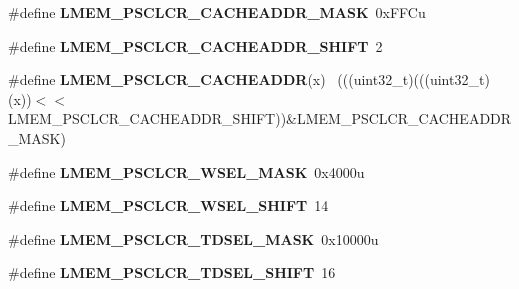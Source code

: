 \begin{DoxyCompactItemize}
\item 
\hypertarget{group___l_m_e_m___register___masks_gaeada5c4e32a4fa79322172a3249c7867}{}\#define {\bfseries L\+M\+E\+M\+\_\+\+P\+S\+C\+L\+C\+R\+\_\+\+C\+A\+C\+H\+E\+A\+D\+D\+R\+\_\+\+M\+A\+S\+K}~0x\+F\+F\+Cu\label{group___l_m_e_m___register___masks_gaeada5c4e32a4fa79322172a3249c7867}

\item 
\hypertarget{group___l_m_e_m___register___masks_gaea4e54a700f090519f4508b42be46a34}{}\#define {\bfseries L\+M\+E\+M\+\_\+\+P\+S\+C\+L\+C\+R\+\_\+\+C\+A\+C\+H\+E\+A\+D\+D\+R\+\_\+\+S\+H\+I\+F\+T}~2\label{group___l_m_e_m___register___masks_gaea4e54a700f090519f4508b42be46a34}

\item 
\hypertarget{group___l_m_e_m___register___masks_gaab05e990b120558e892181b8ae99c2f2}{}\#define {\bfseries L\+M\+E\+M\+\_\+\+P\+S\+C\+L\+C\+R\+\_\+\+C\+A\+C\+H\+E\+A\+D\+D\+R}(x)                              ~(((uint32\+\_\+t)(((uint32\+\_\+t)(x))$<$$<$L\+M\+E\+M\+\_\+\+P\+S\+C\+L\+C\+R\+\_\+\+C\+A\+C\+H\+E\+A\+D\+D\+R\+\_\+\+S\+H\+I\+F\+T))\&L\+M\+E\+M\+\_\+\+P\+S\+C\+L\+C\+R\+\_\+\+C\+A\+C\+H\+E\+A\+D\+D\+R\+\_\+\+M\+A\+S\+K)\label{group___l_m_e_m___register___masks_gaab05e990b120558e892181b8ae99c2f2}

\item 
\hypertarget{group___l_m_e_m___register___masks_ga695f553cc4fdcf8978899095b4f8cf11}{}\#define {\bfseries L\+M\+E\+M\+\_\+\+P\+S\+C\+L\+C\+R\+\_\+\+W\+S\+E\+L\+\_\+\+M\+A\+S\+K}~0x4000u\label{group___l_m_e_m___register___masks_ga695f553cc4fdcf8978899095b4f8cf11}

\item 
\hypertarget{group___l_m_e_m___register___masks_ga433b78072ecaefa608e1aa7dc608071c}{}\#define {\bfseries L\+M\+E\+M\+\_\+\+P\+S\+C\+L\+C\+R\+\_\+\+W\+S\+E\+L\+\_\+\+S\+H\+I\+F\+T}~14\label{group___l_m_e_m___register___masks_ga433b78072ecaefa608e1aa7dc608071c}

\item 
\hypertarget{group___l_m_e_m___register___masks_ga4834f5e2215d0f89a0da522c8e9a93a2}{}\#define {\bfseries L\+M\+E\+M\+\_\+\+P\+S\+C\+L\+C\+R\+\_\+\+T\+D\+S\+E\+L\+\_\+\+M\+A\+S\+K}~0x10000u\label{group___l_m_e_m___register___masks_ga4834f5e2215d0f89a0da522c8e9a93a2}

\item 
\hypertarget{group___l_m_e_m___register___masks_ga866c3ab23b6653cb6141bb7ba4cce9eb}{}\#define {\bfseries L\+M\+E\+M\+\_\+\+P\+S\+C\+L\+C\+R\+\_\+\+T\+D\+S\+E\+L\+\_\+\+S\+H\+I\+F\+T}~16\label{group___l_m_e_m___register___masks_ga866c3ab23b6653cb6141bb7ba4cce9eb}


\end{DoxyCompactItemize}
